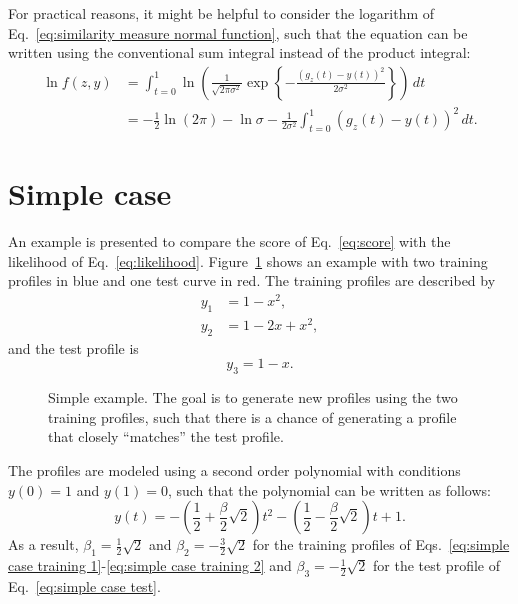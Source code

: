 \documentclass[10pt,final,a4paper,oneside,onecolumn]{article}
\newlength\figurewidth
\newlength\figureheight
\theoremstyle{plain}\newtheorem{definition}{Definition}[section]    %
\theoremstyle{definition}\newtheorem{example}{Example}[section]     %
\theoremstyle{remark}\newtheorem{remarkenv}{Remark}[section]        %
\begin{document}
For practical reasons, it might be helpful to consider the logarithm of Eq.~\eqref{eq:similarity measure normal function}, such that the equation can be written using the conventional sum integral instead of the product integral:
\begin{align}
	\ln f(z,y) &= \int_{t=0}^{1} \ln \left( \frac{1}{\sqrt{2\pi\sigma^2}} \exp \left\{ -\frac{(g_z(t)-y(t))^2}{2\sigma^2} \right\} \right) \,dt \\
	&= -\frac{1}{2} \ln (2\pi) - \ln \sigma - \frac{1}{2\sigma^2} \int_{t=0}^{1} (g_z(t) - y(t))^2 \,dt.
\end{align}



\section{Simple case}
\label{sec:simple case}

An example is presented to compare the score of Eq.~\eqref{eq:score} with the likelihood of Eq.~\eqref{eq:likelihood}. Figure~\ref{fig:simple example profiles} shows an example with two training profiles in blue and one test curve in red. The training profiles are described by 
\begin{align}
	y_1 &= 1 - x^2, \label{eq:simple case training 1} \\
	y_2 &= 1 - 2x + x^2, \label{eq:simple case training 2}
\end{align}
and the test profile is 
\begin{equation} \label{eq:simple case test}
	y_3 = 1-x.
\end{equation}

\begin{figure}
	\centering
	\setlength\figureheight{200pt}
	\setlength\figurewidth{300pt}
	
	\caption{Simple example. The goal is to generate new profiles using the two training profiles, such that there is a chance of generating a profile that closely ``matches'' the test profile.}
	\label{fig:simple example profiles}
\end{figure}

The profiles are modeled using a second order polynomial with conditions $y(0)=1$ and $y(1)=0$, such that the polynomial can be written as follows:
\begin{equation} \label{eq:simple case spline}
	y(t) = -\left( \frac{1}{2} + \frac{\beta}{2}\sqrt{2} \right) t^2 - \left( \frac{1}{2} - \frac{\beta}{2}\sqrt{2}\right) t + 1.
\end{equation}
As a result, $\beta_1=\frac{1}{2}\sqrt{2}$ and $\beta_2=-\frac{3}{2}\sqrt{2}$ for the training profiles of Eqs.~\eqref{eq:simple case training 1}-\eqref{eq:simple case training 2} and $\beta_3=-\frac{1}{2}\sqrt{2}$ for the test profile of Eq.~\eqref{eq:simple case test}. 
\end{document}
